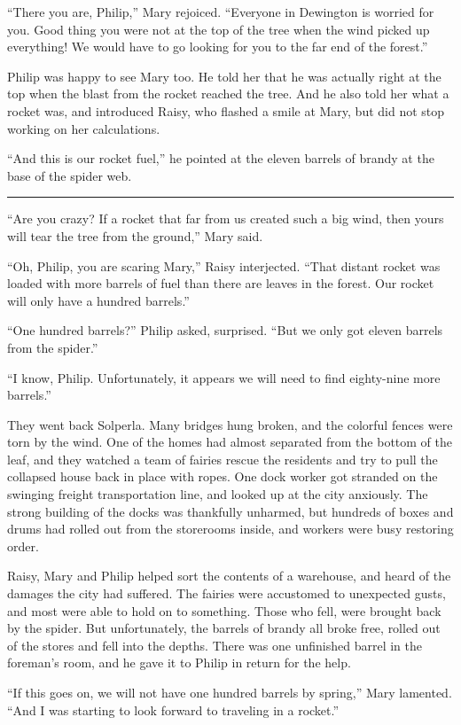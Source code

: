 \documentclass[10pt, draft]{memoir}
\renewcommand{\pfbreakdisplay}{\bigskip \ding{166} \bigskip}
\newcommand{\secbreak}{\fancybreak{\pfbreakdisplay}}
\begin{document}
``There you are, Philip,'' Mary rejoiced. ``Everyone in Dewington is worried
for you. Good thing you were not at the top of the tree when the wind picked up
everything! We would have to go looking for you to the far end of the forest.''

Philip was happy to see Mary too. He told her that he was actually right at the
top when the blast from the rocket reached the tree. And he also told her what
a rocket was, and introduced Raisy, who flashed a smile at Mary, but did not
stop working on her calculations.

``And this is our rocket fuel,'' he pointed at the eleven barrels of brandy at
the base of the spider web.

\secbreak

``Are you crazy? If a rocket that far from us created such a big wind, then
yours will tear the tree from the ground,'' Mary said.

``Oh, Philip, you are scaring Mary,'' Raisy interjected. ``That distant rocket
was loaded with more barrels of fuel than there are leaves in the forest. Our
rocket will only have a hundred barrels.''

``One hundred barrels?'' Philip asked, surprised. ``But we only got eleven
barrels from the spider.''

``I know, Philip. Unfortunately, it appears we will need to find eighty-nine
more barrels.''

They went back Solperla. Many bridges hung broken, and the colorful fences were
torn by the wind. One of the homes had almost separated from the bottom of the
leaf, and they watched a team of fairies rescue the residents and try to pull
the collapsed house back in place with ropes. One dock worker got stranded on
the swinging freight transportation line, and looked up at the city anxiously.
The strong building of the docks was thankfully unharmed, but hundreds of boxes
and drums had rolled out from the storerooms inside, and workers were busy
restoring order.

Raisy, Mary and Philip helped sort the contents of a warehouse, and heard of
the damages the city had suffered. The fairies were accustomed to unexpected
gusts, and most were able to hold on to something. Those who fell, were brought
back by the spider. But unfortunately, the barrels of brandy all broke free,
rolled out of the stores and fell into the depths. There was one unfinished
barrel in the foreman's room, and he gave it to Philip in return for the help.

``If this goes on, we will not have one hundred barrels by spring,'' Mary
lamented. ``And I was starting to look forward to traveling in a rocket.''
\end{document}
